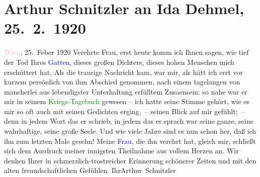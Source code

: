 

               \section[Arthur Schnitzler an Ida Dehmel, 25. 2. 1920]{ Arthur Schnitzler an Ida Dehmel, 25. 2. 1920}\nopagebreak{}\rehead{ }\normalsize\beginnumbering{} \toendnotes[C]{\smallbreak\pagebreak[2]} 
\toendnotes[C]{\smallbreak}\pstart
           \raggedleft{}{\pb}\textcolor{pink}{Wien}{}\ledrightnote{\textcolor{pink}{Wien}}, 25. Feber 1920\pend
           \pstart
           Verehrte Frau, erst heute komm ich Ihnen sagen, wie tief der
                    Tod Ihres \textcolor{blue}{Gatten}{}\ledrightnote{\textcolor{blue}{Richard Dehmel}}, dieses großen Dichters,
                    dieses hohen Menschen mich erschüttert hat. Als die traurige Nachricht kam, war
                    mir, als hätt ich erst vor kurzem persönlich von ihm Abschied genommen, nach
                    einem tagelangen von mancherlei aus lebendigster Unterhaltung erfülltem Zusa{\geminationm}ensein: so nahe war er mir in seinem \textcolor{green}{Kriegs-{\pb}Tagebuch}{} gewesen – ich hatte seine Stimme gehört, wie es mir so oft
                    auch mit seinen Gedichten erging, – seinen Blick auf mir gefühlt; – denn in
                    jedem Wort das er schrieb, in jedem das er sprach war seine ganze, seine
                    wahrhaftige, seine große Seele. Und wie viele Jahre sind es nun schon her, daß
                    ich ihn zum letzten Male gesehn!\pend
           \pstart
           Meine \textcolor{blue}{Frau}{}, die ihn verehrt
                    hat, gleich mir, schließt sich dem Ausdruck meiner innigsten Theilnahme aus
                    vollem Herzen an. Wir denken Ihrer in schmerzlich-trostreicher Erinnerung
                    schönerer Zeiten und mit den alten freundschaftlichen Gefühlen.\pend
           \pstart Ihr\spacefill\mbox{Arthur Schnitzler}\pend{}\endnumbering{}  
      